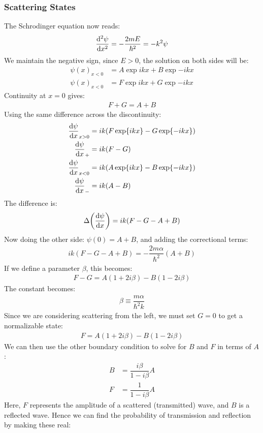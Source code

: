 \subsubsection{Scattering States}
The Schrodinger equation now reads:
\begin{align*}
  \dv[2]{\psi}{x}=-\dfrac{2mE}{\hbar^2}=-k^2\psi
\end{align*}
We maintain the negative sign, since $E>0$, the solution on both sides will be:
\begin{align*}
  \psi(x)_{x<0}&=A\exp{ikx}+B\exp{-ikx} \\
  \psi(x)_{x<0}&=F\exp{ikx}+G\exp{-ikx}
\end{align*}
Continuity at $x=0$ gives:
\begin{align*}
  F+G=A+B
\end{align*}
Using the same difference across the discontinuity:
\begin{align*}
  \dv{\psi}{x}_{x>0}&=ik\qty(F\exp{ikx}-G\exp{-ikx}) \\
  \dv{\psi}{x}_{+}&=ik\qty(F-G) \\
  \dv{\psi}{x}_{x<0}&=ik\qty(A\exp{ikx}-B\exp{-ikx}) \\
  \dv{\psi}{x}_{-}&=ik\qty(A-B) 
\end{align*}
The difference is:
\begin{align*}
  \Delta\qty(\dv{\psi}{x})=ik(F-G-A+B)
\end{align*}
Now doing the other side: $\psi(0)=A+B$, and adding the correctional terms:
\begin{align*}
  ik(F-G-A+B)=-\dfrac{2m\alpha}{\hbar^2}(A+B)
\end{align*}
If we define a parameter $\beta$, this becomes:
\begin{align*}
  F-G=A(1+2i\beta)-B(1-2i\beta)
\end{align*}
The constant becomes:
\begin{align*}
  \beta\equiv\dfrac{m\alpha}{\hbar^2k}
\end{align*}
Since we are considering scattering from the left, we must set $G=0$ to get a normalizable state:
\begin{align*}
  F=A(1+2i\beta)-B(1-2i\beta)
\end{align*}
We can then use the other boundary condition to solve for $B$ and $F$ in terms of $A$:
\begin{align*}
  B&=\dfrac{i\beta}{1-i\beta}A \\
  F&=\dfrac{1}{1-i\beta}A
\end{align*}
Here, $F$ represents the amplitude of a scattered (transmitted) wave, and $B$ is a reflected wave. Hence we can find the probability of transmission and reflection by making these real:
